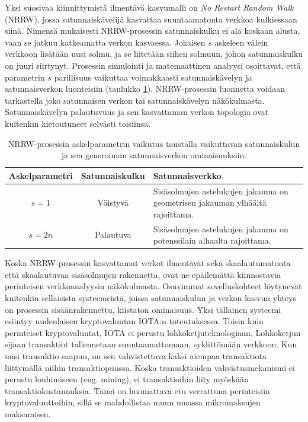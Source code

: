 \documentclass[finnish, 12pt, a4paper, sci, utf8, pdfa]{aaltothesis}
\begin{document}
Yksi suosivaa kiinnittymistä ilmentävä kasvumalli on \textit{No Restart Random Walk} (NRRW), jossa satunnaiskävelijä kasvattaa suuntaamatonta verkkoa kulkiessaan siinä. Nimensä 
mukaisesti NRRW-prosessin satunnaiskulku ei ala koskaan alusta, vaan se jatkuu katkeamatta verkon kasvaessa. Jokaisen $ s $ askeleen välein verkkoon lisätään uusi solmu, ja se liitetään siihen solmuun, johon satunnaiskulku on juuri siirtynyt. Prosessin simulointi ja matemaattinen analyysi osoittavat, että parametrin $ s $ parillisuus vaikuttaa voimakkaasti satunnaiskävelyn ja satunnaisverkon luonteisiin (taulukko \ref{table:nrrw-character}). NRRW-prosessin luonnetta voidaan tarkastella joko satunnaisen verkon tai satunnaiskävelyn näkökulmasta. Satunnaiskävelyn palautuvuus ja sen kasvattaman verkon topologia ovat kuitenkin kietoutuneet selvästi toisiinsa. \cite{Iacobelli}

\begin{table}[htb]
   \caption{NRRW-prosessin askelparametrin vaikutus taustalla vaikuttavan satunnaiskulun ja sen generoiman satunnaisverkon ominaisuuksiin.}
   \label{table:nrrw-character}
   \begin{center}
   \begin{tabular}{|c|c|p{7.5cm}|}
   \hline
   \textbf{Askelparametri} & \textbf{Satunnaiskulku} & \textbf{Satunnaisverkko} \\ \hline
   $ s = 1 $      & Väistyvä        & Sisäsolmujen astelukujen jakauma on geometrisen jakauman ylhäältä rajoittama. \\ \hline
   $ s = 2n $     & Palautuva       & Sisäsolmujen astelukujen jakauma on potenssilain alhaalta rajoittama. \\ \hline
   \end{tabular}
   \end{center}
\end{table}

Koska NRRW-prosessin kasvattamat verkot ilmentävät sekä skaalautumatonta että skaalautuvaa sisäsolmujen rakennetta, ovat ne epäilemättä kiinnostavia perinteisen verkkoanalyysin näkökulmasta. 
Osuvimmat sovelluskohteet löytynevät kuitenkin sellaisista systeemeistä, joissa satunnaiskulun ja verkon kasvun yhteys on prosessin sisäänrakennettu, kiistaton ominaisuus. Yksi tällainen
systeemi esiintyy uudenlaisen kryptovaluutan IOTA:n toteutuksessa. Toisin kuin perinteiset kryptovaluutat, IOTA ei perustu lohkoketjuteknologiaan. Lohkoketjun sijaan transaktiot 
tallennetaan suuntaamattomaan, syklittömään verkkoon. Kun uusi transaktio saapuu, on sen vahvistettava kaksi aiempaa transaktiota liittymällä niihin transaktiopuussa. Koska 
transaktioiden vahvistusmekanismi ei perustu louhimiseen (eng. mining), ei transaktioihin liity myöskään transaktiokustannuksia. Tämä on huomattava etu verrattuna perinteisiin
kryptovaluuttoihin, sillä se mahdollistaa muun muassa mikromaksujen maksamisen. \cite{Popov-WP}
\end{document}
